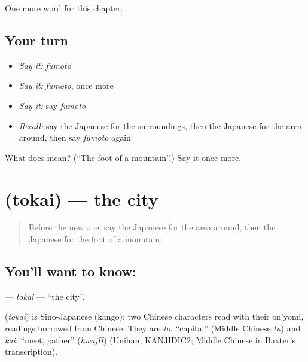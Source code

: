 \begin{grammarlens}[title={What you've built}]
One more word for this chapter.
\end{grammarlens}

\subsection*{Your turn}
\begin{itemize}
\raggedright
  \item \emph{Say it:} \emph{fumoto}
  \item \emph{Say it:} \emph{fumoto}, once more
  \item \emph{Say it:} say \emph{fumoto}
  \item \emph{Recall:} say the Japanese for the surroundings, then the Japanese for the area around, then say \emph{fumoto} again
\end{itemize}

\begin{tcolorbox}[breakable,colback=teal!4,colframe=teal!35!black,title={Before you move on}]
What does  mean? (\textquotedblleft{}The foot of a mountain\textquotedblright{}.) Say it once more.
\end{tcolorbox}
\section[\texorpdfstring{\ja{とかい} (tokai)}{とかい (tokai)}]{ (tokai) — the city}

\label{lesson:JA-C81-tokai}



\begin{quote}
Before the new one: say the Japanese for the area around, then the Japanese for the foot of a mountain.
\end{quote}

\subsection*{You'll want to know: }
\textbf{} — \emph{tokai} — \textquotedblleft{}the city\textquotedblright{}.

\begin{cousinweb}
\textbf{} (\emph{tokai}) is Sino-Japanese (kango): two Chinese characters read with their on'yomi, readings borrowed from Chinese. They are \emph{to}, \textquotedblleft{}capital\textquotedblright{} (Middle Chinese \emph{tu}) and \emph{kai}, \textquotedblleft{}meet, gather\textquotedblright{} (\emph{hwajH}) (Unihan, KANJIDIC2; Middle Chinese in Baxter's transcription).
\end{cousinweb}

